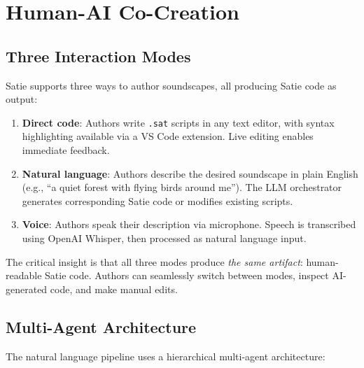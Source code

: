\documentclass[sigconf,anonymous,review]{nimeart}
\begin{document}

\section{Human-AI Co-Creation}

\subsection{Three Interaction Modes}

Satie supports three ways to author soundscapes, all producing Satie code as output:

\begin{enumerate}
    \item \textbf{Direct code}: Authors write \texttt{.sat} scripts in any text editor, with syntax highlighting available via a VS Code extension. Live editing enables immediate feedback.

    \item \textbf{Natural language}: Authors describe the desired soundscape in plain English (e.g., ``a quiet forest with flying birds around me''). The LLM orchestrator generates corresponding Satie code or modifies existing scripts.

    \item \textbf{Voice}: Authors speak their description via microphone. Speech is transcribed using OpenAI Whisper, then processed as natural language input.
\end{enumerate}

The critical insight is that all three modes produce \textit{the same artifact}: human-readable Satie code. Authors can seamlessly switch between modes, inspect AI-generated code, and make manual edits.

\subsection{Multi-Agent Architecture}

The natural language pipeline uses a hierarchical multi-agent architecture:
\end{document}
